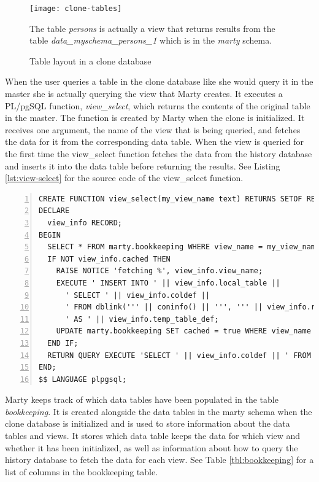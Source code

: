 \begin{figure}[h!]
  \centering
    \texttt{[image: clone-tables]}
  \caption{Table layout in a clone database}
  \medskip
  \small
  The table \textit{persons} is actually a view that returns results from the table \textit{data\_myschema\_persons\_1} which is in the \textit{marty} schema.
  \label{fig:clone-tables-2}
\end{figure}

When the user queries a table in the clone database like she would query it in the master she is actually querying the view that Marty creates.
It executes a PL/pgSQL function, \textit{view\_select}, which returns the contents of the original table in the master.
The function is created by Marty when the clone is initialized.
It receives one argument, the name of the view that is being queried, and fetches the data for it from the corresponding data table.
When the view is queried for the first time the view\_select function fetches the data from the history database and inserts it into the data table before returning the results.
See Listing \ref{lst:view-select} for the source code of the view\_select function.

\begin{lstlisting}[caption={The view\_select function},label={lst:view-select},numbers=left,xleftmargin=2em]
CREATE FUNCTION view_select(my_view_name text) RETURNS SETOF RECORD AS $$
DECLARE
  view_info RECORD;
BEGIN
  SELECT * FROM marty.bookkeeping WHERE view_name = my_view_name INTO view_info;
  IF NOT view_info.cached THEN
    RAISE NOTICE 'fetching %', view_info.view_name;
    EXECUTE ' INSERT INTO ' || view_info.local_table ||
      ' SELECT ' || view_info.coldef ||
      ' FROM dblink(''' || coninfo() || ''', ''' || view_info.remote_select_stmt || ''')'
      ' AS ' || view_info.temp_table_def;
	UPDATE marty.bookkeeping SET cached = true WHERE view_name = my_view_name;
  END IF;
  RETURN QUERY EXECUTE 'SELECT ' || view_info.coldef || ' FROM ' || view_info.local_table;
END;
$$ LANGUAGE plpgsql;
\end{lstlisting}

Marty keeps track of which data tables have been populated in the table \textit{bookkeeping}.
It is created alongside the data tables in the marty schema when the clone database is initialized and is used to store information about the data tables and views.
It stores which data table keeps the data for which view and whether it has been initialized, as well as information about how to query the history database to fetch the data for each view.
See Table \ref{tbl:bookkeeping} for a list of columns in the bookkeeping table.

